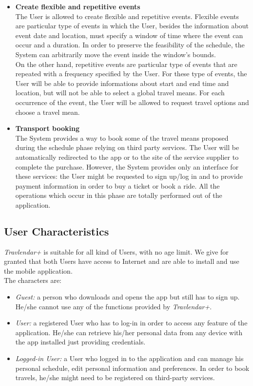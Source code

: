 \begin{itemize}
	\item \textbf{Create flexible and repetitive events}\\
	The User is allowed to create flexible and repetitive events. Flexible events are particular type of events in which the User, besides the information about event date and location, must specify a window of time where the event can occur and a duration. In order to preserve the feasibility of the schedule, the System can arbitrarily move the event inside the window's bounds.\\
	On the other hand, repetitive events are particular type of events that are repeated with a frequency specified by the User. For these type of events, the User will be able to provide informations about start and end time and location, but will not be able to select a global travel means. For each occurrence of the event, the User will be allowed to request travel options and choose a travel mean.
	
	\item \textbf{Transport booking}\\
	The System provides a way to book some of the travel means proposed during the schedule phase relying on third party services. The User will be automatically redirected to the app or to the site of the service supplier to complete the purchase.
	However, the System provides only an interface for these services: the User might be requested to sign up/log in and to provide payment information in order to buy a ticket or book a ride. All the operations which occur in this phase are totally performed out of the application.
\end{itemize}

\subsection{User Characteristics}
\textit{Travlendar+} is suitable for all kind of Users, with no age limit.
We give for granted that both Users have access to Internet and are able to install and use the mobile application.\\
The characters are:
\begin{itemize}
	\item \textit{Guest:} a person who downloads and opens the app but still has to sign up. He/she cannot use any of the functions provided by \textit{Travlendar+}.
	\item \textit{User:} a registered User who has to log-in in order to access any feature of the application. He/she can retrieve his/her personal data from any device with the app installed just providing credentials.
	\item \textit{Logged-in User:} a User who logged in to the application and can manage his personal schedule, edit personal information and preferences. In order to book travels, he/she might need to be registered on third-party services.
\end{itemize}

